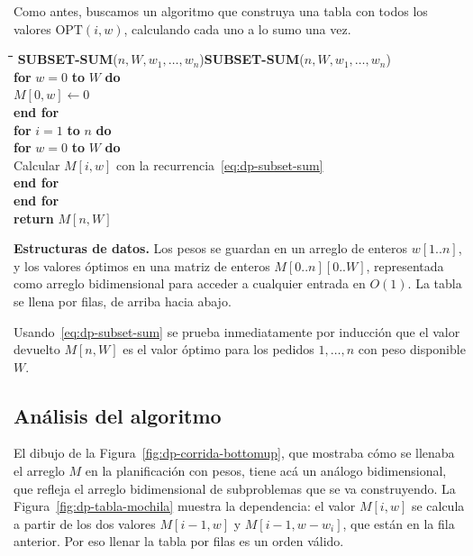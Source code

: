 \documentclass[12pt, spanish, oneside, openany]{book}
\newcommand{\pl}[1]{\makebox[1.6em][r]{\texttt{\footnotesize #1}}\hspace{0.9em}}
\newenvironment{pseudo}[1]{%
  \begin{center}%
  \begin{mdframed}[style=pseudobox]%
  \small
  \begin{tabbing}%
  \hspace{2.5em}\=\hspace{1.5em}\=\hspace{1.5em}\=\hspace{1.5em}\=\hspace{1.5em}\=\kill
  \def\pseudotitulo{#1}\ifx\pseudotitulo\empty\else#1\\[3pt]\fi}%
  {\end{tabbing}\end{mdframed}\end{center}}
\newenvironment{estructuras}%
  {\begin{center}\begin{minipage}{0.93\textwidth}\begin{mdframed}[style=estrbox]%
   \small\textbf{Estructuras de datos.}\;}%
  {\end{mdframed}\end{minipage}\end{center}}
\theoremstyle{uprightplain}
\theoremstyle{definition}
\theoremstyle{remark}
\theoremstyle{definition}
\newcommand{\OPT}{\mathrm{OPT}} %
\begin{document}
Como antes, buscamos un algoritmo que construya una tabla con todos los valores $\OPT(i,w)$, calculando cada uno a lo sumo una vez.

\begin{pseudo}{\textbf{SUBSET-SUM}($n, W, w_1,\dots,w_n$)}
\pl{1}\> \textbf{for} $w = 0$ \textbf{to} $W$ \textbf{do}\\
\pl{2}\>\> $M[0,w] \leftarrow 0$\\
\pl{3}\> \textbf{end for}\\
\pl{4}\> \textbf{for} $i = 1$ \textbf{to} $n$ \textbf{do}\\
\pl{5}\>\> \textbf{for} $w = 0$ \textbf{to} $W$ \textbf{do}\\
\pl{6}\>\>\> Calcular $M[i,w]$ con la recurrencia~\eqref{eq:dp-subset-sum}\\
\pl{7}\>\> \textbf{end for}\\
\pl{8}\> \textbf{end for}\\
\pl{9}\> \textbf{return} $M[n,W]$
\end{pseudo}

\begin{estructuras}
Los pesos se guardan en un arreglo de enteros $w[1..n]$, y los valores óptimos
en una matriz de enteros $M[0..n][0..W]$, representada como arreglo
bidimensional para acceder a cualquier entrada en $O(1)$. La tabla se llena
por filas, de arriba hacia abajo.
\end{estructuras}

Usando~\eqref{eq:dp-subset-sum} se prueba inmediatamente por inducción que el valor devuelto $M[n,W]$ es el valor óptimo para los pedidos $1,\dots,n$ con peso disponible $W$.

\subsection{Análisis del algoritmo}

El dibujo de la Figura~\ref{fig:dp-corrida-bottomup}, que mostraba cómo se llenaba el arreglo $M$ en la planificación con pesos, tiene acá un análogo bidimensional, que refleja el arreglo bidimensional de subproblemas que se va construyendo. La Figura~\ref{fig:dp-tabla-mochila} muestra la dependencia: el valor $M[i,w]$ se calcula a partir de los dos valores $M[i-1,w]$ y $M[i-1,w-w_i]$, que están en la fila anterior. Por eso llenar la tabla por filas es un orden válido.
\end{document}

